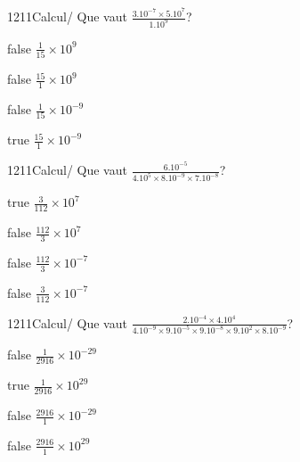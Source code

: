 \documentclass[11pt]{article}
\begin{document}
            \begin{question}{1211}{Calcul}{}{/}
                Que vaut $\frac{3.10^{-7}\times 5.10^{7}}{1.10^{9}}$?
            \end{question}
            
            \begin{reponses}
                \item[false] $\frac{1}{15}\times 10^{9}$
                \item[false] $\frac{15}{1}\times 10^{9}$
                \item[false] $\frac{1}{15}\times 10^{-9}$
                \item[true] $\frac{15}{1}\times 10^{-9}$
            \end{reponses}
            
            \begin{question}{1211}{Calcul}{}{/}
                Que vaut $\frac{6.10^{-5}}{4.10^{5}\times 8.10^{-9}\times 7.10^{-8}}$?
            \end{question}
            
            \begin{reponses}
                \item[true] $\frac{3}{112}\times 10^{7}$
                \item[false] $\frac{112}{3}\times 10^{7}$
                \item[false] $\frac{112}{3}\times 10^{-7}$
                \item[false] $\frac{3}{112}\times 10^{-7}$
            \end{reponses}
            
            \begin{question}{1211}{Calcul}{}{/}
                Que vaut $\frac{2.10^{-4}\times 4.10^{4}}{4.10^{-9}\times 9.10^{-5}\times 9.10^{-8}\times 9.10^{2}\times 8.10^{-9}}$?
            \end{question}
            
            \begin{reponses}
                \item[false] $\frac{1}{2916}\times 10^{-29}$
                \item[true] $\frac{1}{2916}\times 10^{29}$
                \item[false] $\frac{2916}{1}\times 10^{-29}$
                \item[false] $\frac{2916}{1}\times 10^{29}$
            \end{reponses}
            
\end{document}
